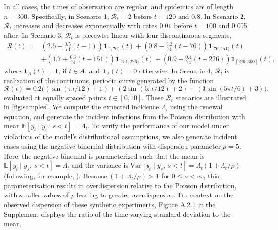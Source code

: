 \documentclass[10pt,letterpaper]{article}
\newcommand{\lr}[1]{\left(#1\right)}
\def\bbE{\mathbb{E}}
\def\calR{\mathcal{R}}
\begin{document}
In all cases, the times of observation are regular, and epidemics are of length
$n=300$. Specifically, in Scenario 1, $\calR_t = 2$ before $t=120$ and 0.8. In
Scenario 2, $\calR_t$ increases and decreases exponentially with rates $0.01$
before $t=100$ and 0.005 after. In Scenario 3, $\calR_t$ is piecewise linear
with four discontinuous segments, 
\begin{equation}
  \begin{split}
    \calR(t) =& \lr{2.5 - \frac{0.5}{74}\lr{t-1}} \boldsymbol{1}_{[1,76)}(t)
     + \lr{0.8 - \frac{0.2}{74}\lr{t-76}} \boldsymbol{1}_{[76,151)}(t) \\
    & + \lr{1.7 + \frac{0.3}{74}\lr{t-151}} \boldsymbol{1}_{[151,226)}(t)
       + \lr{0.9 - \frac{0.4}{74}\lr{t-226}} \boldsymbol{1}_{[226,300]}(t),
  \end{split}
\end{equation}
where $\boldsymbol{1}_{A}(t) = 1$, if $t\in A$, and $\boldsymbol{1}_{A}(t)=0$ otherwise. 
In Scenario 4, $\calR_t$ is realization of the 
continuous, periodic curve generated by the function 
\begin{equation}
  \calR(t) = 0.2 \big(\lr{\sin(\pi t/12) + 1} + \lr{2 \sin\lr{5 \pi t / 12} + 2} 
  + \lr{3 \sin(5\pi t / 6) + 3}\big),
\end{equation} 
evaluated at equally spaced points $t\in [0,10]$. These $\calR_t$ scenarios are
illustrated in \autoref{fig:samples}. We compute the expected incidence
$\Lambda_t$ using the renewal equation, and generate the incident infections
from the Poisson distribution with mean $\bbE[y_t \mid y_s,\ s<t] = \Lambda_t$.
To verify the performance of our model under violations of the model's
distributional assumptions, we also generate incident cases using the negative
binomial distribution with dispersion parameter $\rho = 5$. Here, the negative
binomial is parameterized such that the mean is
$\bbE[y_t\mid y_s,\ s<t] = \Lambda_t$ and the variance is $\textrm{Var}[y_t \mid
y_s,\ s<t] = \Lambda_t(1 +
\Lambda_t / \rho)$ (following, for example, \cite{gressani2022epilps}). Because
$(1 + \Lambda_t / \rho)> 1$ for  $0\leq\rho <\infty$, this parameterization results
in overdispersion relative to the Poisson distribution, with smaller values of
$\rho$ leading to greater overdispersion. For context on the observed dispersion
of these synthetic experiments, Figure A.2.1 in the Supplement displays the
ratio of the time-varying standard deviation to the mean. 
\end{document}
